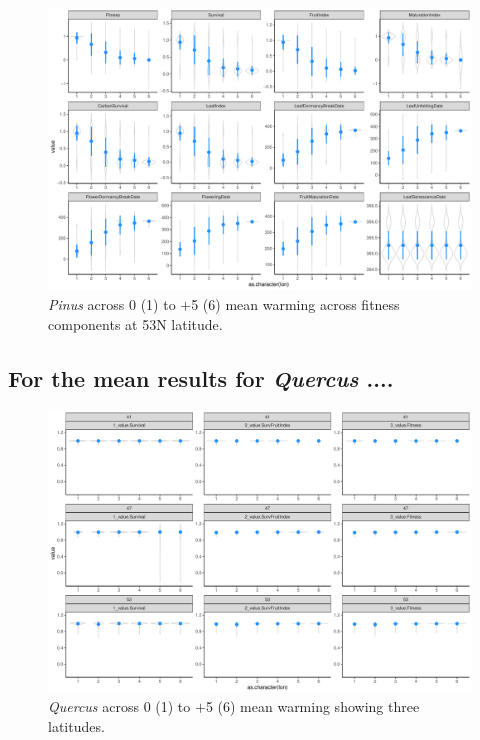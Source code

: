 \documentclass[11pt,letter]{article}
\begin{document}
\begin{figure} 
 \begin{center}
\noindent \includegraphics[width=1\textwidth]{..//analyses/graphs/phenofit/sims/meansim53_allmetricsPS.pdf}
  \caption{\emph{Pinus} across 0 (1) to $+$5 (6) mean warming across fitness components at 53\degree N latitude. }
  \label{fig:pinusmean53}
  \end{center}
\end{figure}

\clearpage

\subsection{For the mean results for \emph{Quercus} ....}

\begin{figure} 
 \begin{center}
\noindent \includegraphics[width=1\textwidth]{..//analyses/graphs/phenofit/sims/metrics3/meansim_3metricsQR.pdf}
  \caption{\emph{Quercus} across 0 (1) to $+$5 (6) mean warming showing three latitudes.}
  \label{fig:quercusmean3}
  \end{center}
\end{figure}
\end{document}
